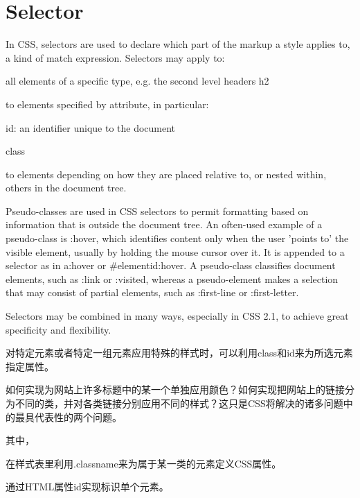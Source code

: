 \section{Selector}

In CSS, selectors are used to declare which part of the markup a style applies to, a kind of match expression. Selectors may apply to:

\begin{compactitem}
\item all elements of a specific type, e.g. the second level headers h2
\item to elements specified by attribute, in particular:
	\begin{compactitem}
	\item id: an identifier unique to the document
	\item class
	\end{compactitem}
\item to elements depending on how they are placed relative to, or nested within, others in the document tree.
\end{compactitem}

Pseudo-classes are used in CSS selectors to permit formatting based on information that is outside the document tree. An often-used example of a pseudo-class is :hover, which identifies content only when the user 'points to' the visible element, usually by holding the mouse cursor over it. It is appended to a selector as in a:hover or \#elementid:hover. A pseudo-class classifies document elements, such as :link or :visited, whereas a pseudo-element makes a selection that may consist of partial elements, such as :first-line or :first-letter.

Selectors may be combined in many ways, especially in CSS 2.1, to achieve great specificity and flexibility.

对特定元素或者特定一组元素应用特殊的样式时，可以利用class和id来为所选元素指定属性。

如何实现为网站上许多标题中的某一个单独应用颜色？如何实现把网站上的链接分为不同的类，并对各类链接分别应用不同的样式？这只是CSS将解决的诸多问题中的最具代表性的两个问题。

其中，

\begin{compactitem}
\item 在样式表里利用.classname来为属于某一类的元素定义CSS属性。
\item 通过HTML属性id实现标识单个元素。
\end{compactitem}


